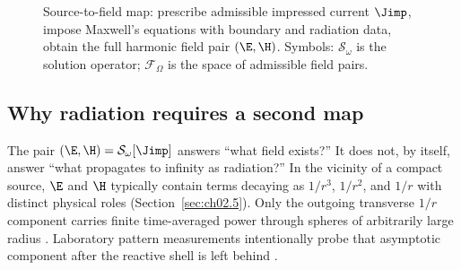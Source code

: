 \begin{figure}[t]
\centering
{}
\caption{Source-to-field map: prescribe admissible impressed current $\Jimp$, impose Maxwell's equations with boundary and radiation data, obtain the full harmonic field pair $(\E,\H)$. Symbols: $\mathcal{S}_\omega$ is the solution operator; $\mathcal{F}_\Omega$ is the space of admissible field pairs.}
\label{fig:ch2.source-to-maxwell-field}
\end{figure}

\subsection{Why radiation requires a second map}
\label{sec:ch02.1.3}

The pair $(\E,\H)=\mathcal{S}_\omega[\Jimp]$ answers ``what field exists?'' It does not, by itself, answer ``what propagates to infinity as radiation?'' In the vicinity of a compact source, $\E$ and $\H$ typically contain terms decaying as $1/r^3$, $1/r^2$, and $1/r$ with distinct physical roles (Section~\ref{sec:ch02.5}). Only the outgoing transverse $1/r$ component carries finite time-averaged power through spheres of arbitrarily large radius \cite{poynting1884,stratton1941}. Laboratory pattern measurements intentionally probe that asymptotic component after the reactive shell is left behind \cite{harrington2001}.


